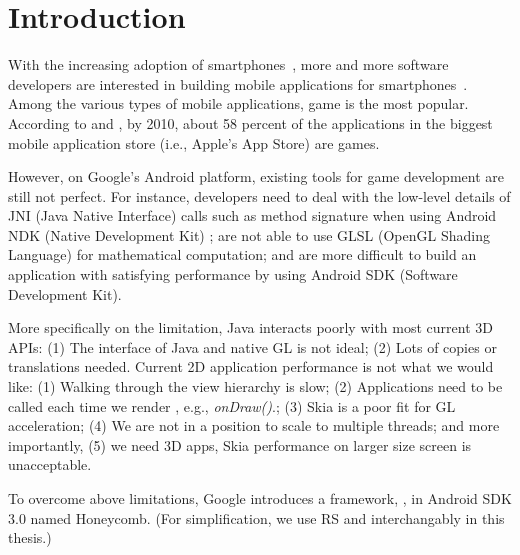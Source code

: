 \chapter{Introduction}
\label{c:intro}


With the increasing adoption of smartphones~\cite{increasing-phones}, more and more software developers are interested in building mobile applications for smartphones~\cite{attract-game-developer}. Among the various types of mobile applications, game is the most popular. According to \cite{gamepercent1} and \cite{gamepercent2}, by 2010, about 58 percent of the applications in the biggest mobile application store (i.e., Apple's App Store) are games.

However, on Google's Android platform, existing tools for game development are still not perfect. For instance, developers need to deal with the low-level details of JNI (Java Native Interface) calls such as method signature when using Android NDK (Native Development Kit) ; are not able to use GLSL (OpenGL Shading Language) for mathematical computation; and are more difficult to build an application with satisfying performance by using Android SDK (Software Development Kit).

More specifically on the limitation, Java interacts poorly with most current 3D APIs: (1) The interface of Java and native GL is not ideal; (2) Lots of copies or translations needed. Current 2D application performance is not what we would like: (1) Walking through the view hierarchy is slow; (2) Applications need to be called each time we render , e.g., \textit{onDraw()}.; (3) Skia is a poor fit for GL acceleration; (4) We are not in a position to scale to multiple threads; and more importantly, (5) we need 3D apps, Skia performance on larger size screen is unacceptable.

To overcome above limitations, Google introduces a framework, \RS{}\cite{renderscript-part1}, in Android SDK 3.0 named Honeycomb. (For simplification, we use RS and \RS{} interchangably in this thesis.) 

